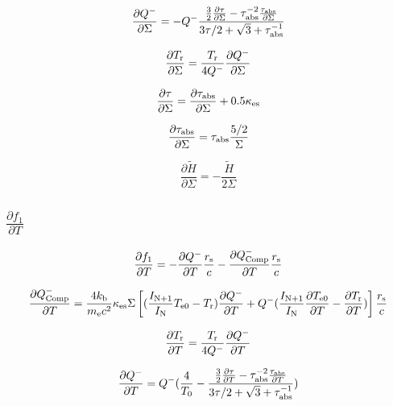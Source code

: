 \documentclass[11pt, oneside]{article}   	%
\begin{document}
\begin{equation}
	\frac{\partial Q^-}{\partial\Sigma} = -Q^-\frac{\frac{3}{2}\frac{\partial\tau}{\partial\Sigma}-\tau^{-2}_{\rm abs}\frac{\tau_{\rm abs}}{\partial\Sigma}}{3\tau/2 + \sqrt{3} + \tau_{\rm abs}^{-1}}
\end{equation}

\begin{equation}
	\frac{\partial T_{\rm r}}{\partial\Sigma} = \frac{T_{\rm r}}{4Q^-}\frac{\partial Q^-}{\partial\Sigma}
\end{equation}

\begin{equation}
	\frac{\partial\tau}{\partial\Sigma} = \frac{\partial\tau_{\rm abs}}{\partial\Sigma} + 0.5\kappa_{\rm es}
\end{equation}

\begin{equation}
	\frac{\partial\tau_{\rm abs}}{\partial\Sigma} = \tau_{\rm abs}\frac{5/2}{\Sigma}
\end{equation}

\begin{equation}
	\frac{\partial \tilde H}{\partial \Sigma} = -\frac{\tilde H}{2\Sigma}
\end{equation}

\subsection*{$\frac{\partial f_1}{\partial T}$}
\begin{equation}
	\frac{\partial f_1}{\partial T} = - \frac{\partial Q^-}{\partial T}\frac{r_{\rm s}}{c} - \frac{\partial Q^-_{\rm Comp}}{\partial T}\frac{r_{\rm s}}{c}
\end{equation}

\begin{equation}
	\frac{\partial Q^-_{\rm Comp}}{\partial T} = \frac{4k_{\rm b}}{m_{\rm e}c^2}\kappa_{\rm es}\Sigma\left[ (\frac{I_{\rm N+1}}{I_{\rm N}}T_{\rm e0} - T_{\rm r})\frac{\partial Q^-}{\partial T} + Q^-(\frac{I_{\rm N+1}}{I_{\rm N}}\frac{\partial T_{\rm e0}}{\partial T} - \frac{\partial T_{\rm r}}{\partial T})\right]\frac{r_{\rm s}}{c}
\end{equation}

\begin{equation}
	\frac{\partial T_{\rm r}}{\partial T} = \frac{T_{\rm r}}{4Q^-}\frac{\partial Q^-}{\partial T}
\end{equation}

\begin{equation}
	\frac{\partial Q^-}{\partial T} = Q^-(\frac{4}{T_0} - \frac{\frac{3}{2}\frac{\partial\tau}{\partial T}-\tau^{-2}_{\rm abs}\frac{\tau_{\rm abs}}{\partial T}}{3\tau/2 + \sqrt{3} + \tau_{\rm abs}^{-1}})
\end{equation}
\end{document}
